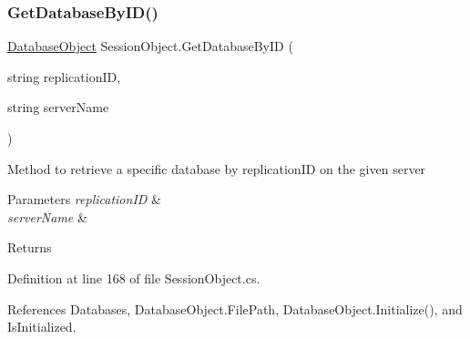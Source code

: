 \subsubsection{\texorpdfstring{Get\+Database\+By\+I\+D()}{GetDatabaseByID()}}
{\footnotesize\ttfamily \mbox{\hyperlink{class_database_object}{Database\+Object}} Session\+Object.\+Get\+Database\+By\+ID (\begin{DoxyParamCaption}\item[{string}]{replication\+ID,  }\item[{string}]{server\+Name }\end{DoxyParamCaption})}



Method to retrieve a specific database by replication\+ID on the given server 


\begin{DoxyParams}{Parameters}
{\em replication\+ID} & \\
\hline
{\em server\+Name} & \\
\hline
\end{DoxyParams}
\begin{DoxyReturn}{Returns}

\end{DoxyReturn}


Definition at line 168 of file Session\+Object.\+cs.



References Databases, Database\+Object.\+File\+Path, Database\+Object.\+Initialize(), and Is\+Initialized.


